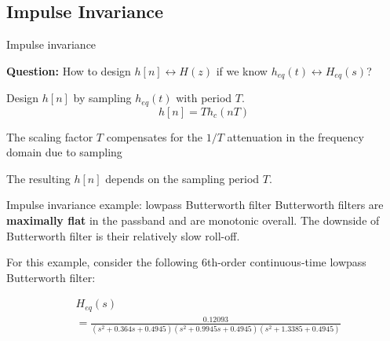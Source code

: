 \documentclass[10pt]{beamer}
\begin{document}
\subsection{Impulse Invariance}
\begin{frame}{Impulse invariance}

\textbf{Question:} How to design $h[n] \longleftrightarrow H(z)$ if we know $h_{eq}(t) \longleftrightarrow H_{eq}(s)$?

\begin{center}
	\def\Heff{1}
	\resizebox{\linewidth}{!}{}
\end{center}

Design $h[n]$ by sampling $h_{eq}(t)$ with period $T$.
\begin{equation}
	h[n] = Th_c(nT) \tag{impulse invariance}
\end{equation}

The scaling factor $T$ compensates for the $1/T$ attenuation in the frequency domain due to sampling

The resulting $h[n]$ depends on the sampling period $T$.

\end{frame}

\begin{frame}{Impulse invariance example: lowpass Butterworth filter}
Butterworth filters are \textbf{maximally flat} in the passband and are monotonic overall. The downside of Butterworth filter is their relatively slow roll-off.
\vspace{0.25cm}

For this example, consider the following 6th-order continuous-time lowpass Butterworth filter:

\begin{align*}
&H_{eq}(s)  \\
&= \frac{0.12093}{(s^2 + 0.364s + 0.4945)(s^2 + 0.9945s + 0.4945)(s^2 + 1.3385 + 0.4945)}
\end{align*}

\end{frame}
\end{document}

